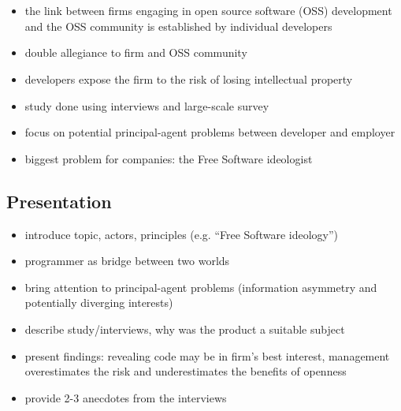 \documentclass[a4paper]{scrartcl}
\begin{document}
\section*{}

\begin{itemize}
\item the link between firms engaging in open source software (OSS) development and the OSS community is established by individual developers 
\item double allegiance to firm and OSS community
\item developers expose the firm to the risk of losing intellectual property
\item study done using interviews and large-scale survey
\item focus on potential principal-agent problems between developer and employer
\item biggest problem for companies: the Free Software ideologist
\end{itemize}

\subsection*{Presentation}

\begin{itemize}
\item introduce topic, actors, principles (e.g. ``Free Software ideology'')
\item programmer as bridge between two worlds
\item bring attention to principal-agent problems (information asymmetry and potentially diverging interests)
\item describe study/interviews, why was the product a suitable subject
\item present findings: revealing code may be in firm's best interest, management overestimates the risk and underestimates the benefits of openness
\item provide 2-3 anecdotes from the interviews
\end{itemize}


\printbibliography[keyword=innovation]
\end{document}
